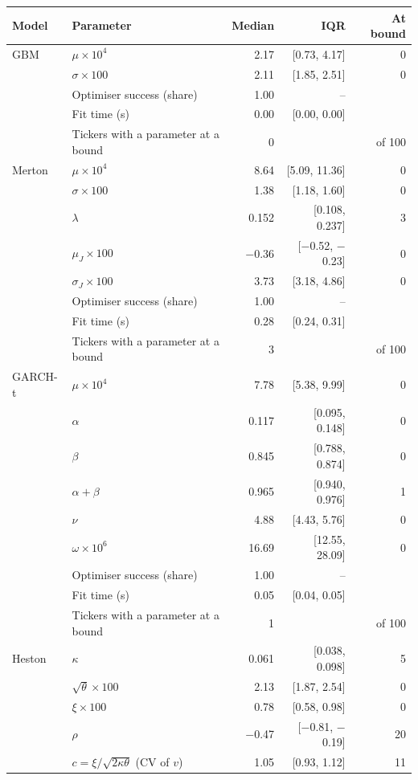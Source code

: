 \begin{tabular}{llrrr}
\toprule
Model & Parameter & Median & IQR & At bound \\
\midrule
GBM & $\mu\times 10^4$ & 2.17 & [0.73, 4.17] & 0 \\
 & $\sigma\times 100$ & 2.11 & [1.85, 2.51] & 0 \\
 & Optimiser success (share) & 1.00 & -- &  \\
 & Fit time (s) & 0.00 & [0.00, 0.00] &  \\
 & Tickers with a parameter at a bound & 0 &  & of 100 \\
Merton & $\mu\times 10^4$ & 8.64 & [5.09, 11.36] & 0 \\
 & $\sigma\times 100$ & 1.38 & [1.18, 1.60] & 0 \\
 & $\lambda$ & 0.152 & [0.108, 0.237] & 3 \\
 & $\mu_J\times 100$ & $-$0.36 & [$-$0.52, $-$0.23] & 0 \\
 & $\sigma_J\times 100$ & 3.73 & [3.18, 4.86] & 0 \\
 & Optimiser success (share) & 1.00 & -- &  \\
 & Fit time (s) & 0.28 & [0.24, 0.31] &  \\
 & Tickers with a parameter at a bound & 3 &  & of 100 \\
GARCH-t & $\mu\times 10^4$ & 7.78 & [5.38, 9.99] & 0 \\
 & $\alpha$ & 0.117 & [0.095, 0.148] & 0 \\
 & $\beta$ & 0.845 & [0.788, 0.874] & 0 \\
 & $\alpha+\beta$ & 0.965 & [0.940, 0.976] & 1 \\
 & $\nu$ & 4.88 & [4.43, 5.76] & 0 \\
 & $\omega\times 10^6$ & 16.69 & [12.55, 28.09] & 0 \\
 & Optimiser success (share) & 1.00 & -- &  \\
 & Fit time (s) & 0.05 & [0.04, 0.05] &  \\
 & Tickers with a parameter at a bound & 1 &  & of 100 \\
Heston & $\kappa$ & 0.061 & [0.038, 0.098] & 5 \\
 & $\sqrt{\theta}\times 100$ & 2.13 & [1.87, 2.54] & 0 \\
 & $\xi\times 100$ & 0.78 & [0.58, 0.98] & 0 \\
 & $\rho$ & $-$0.47 & [$-$0.81, $-$0.19] & 20 \\
 & $c=\xi/\sqrt{2\kappa\theta}$ (CV of $v$) & 1.05 & [0.93, 1.12] & 11 \\

\end{tabular}

